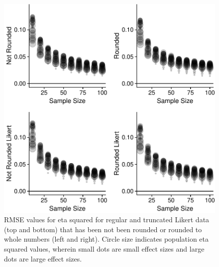 \documentclass[english,man]{apa6}
\theoremstyle{definition}
\theoremstyle{definition}
\theoremstyle{definition}
\theoremstyle{remark}
\begin{document}
\begin{figure}[htbp]
\centering
\includegraphics{buchanan_scofield_files/figure-latex/across-graph-rmse-1.pdf}
\caption{\label{fig:across-graph-rmse}RMSE values for eta squared for
regular and truncated Likert data (top and bottom) that has been not
been rounded or rounded to whole numbers (left and right). Circle size
indicates population eta squared values, wherein small dots are small
effect sizes and large dots are large effect sizes.}
\end{figure}
\end{document}
